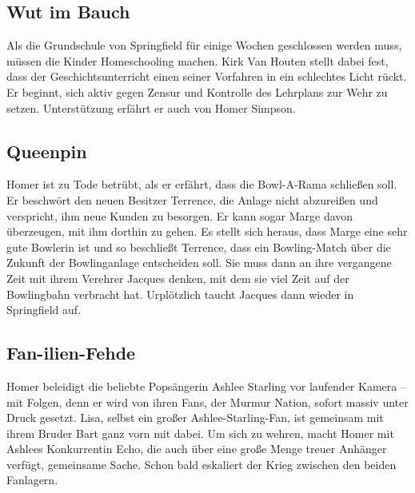 \subsection{Wut im Bauch}
Als die Grundschule von Springfield für einige Wochen geschlossen werden muss, müssen die Kinder Homeschooling machen. Kirk Van Houten stellt dabei fest, dass der Geschichtsunterricht einen seiner Vorfahren in ein schlechtes Licht rückt. Er beginnt, sich aktiv gegen Zensur und Kontrolle des Lehrplans zur Wehr zu setzen. Unterstützung erfährt er auch von Homer Simpson.


\subsection{Queenpin}
Homer ist zu Tode betrübt, als er erfährt, dass die Bowl-A-Rama schließen soll. Er beschwört den neuen Besitzer Terrence, die Anlage nicht abzureißen und verspricht, ihm neue Kunden zu besorgen. Er kann sogar Marge davon überzeugen, mit ihm dorthin zu gehen. Es stellt sich heraus, dass Marge eine sehr gute Bowlerin ist und so beschließt Terrence, dass ein Bowling-Match über die Zukunft der Bowlinganlage entscheiden soll. Sie muss dann an ihre vergangene Zeit mit ihrem Verehrer Jacques denken, mit dem sie viel Zeit auf der Bowlingbahn verbracht hat. Urplötzlich taucht Jacques dann wieder in Springfield auf.


\subsection{Fan-ilien-Fehde}
Homer beleidigt die beliebte Popsängerin Ashlee Starling vor laufender Kamera -- mit Folgen, denn er wird von ihren Fans, der Murmur Nation, sofort massiv unter Druck gesetzt. Lisa, selbst ein großer Ashlee-Starling-Fan, ist gemeinsam mit ihrem Bruder Bart ganz vorn mit dabei. Um sich zu wehren, macht Homer mit Ashlees Konkurrentin Echo, die auch über eine große Menge treuer Anhänger verfügt, gemeinsame Sache. Schon bald eskaliert der Krieg zwischen den beiden Fanlagern.

